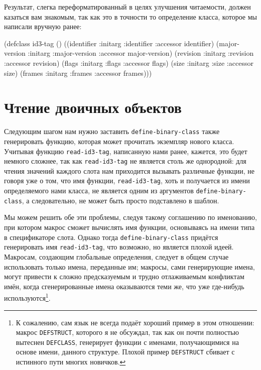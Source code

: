 Результат, слегка переформатированный в целях улучшения читаемости, должен казаться вам
знакомым, так как это в точности то определение класса, которое мы написали вручную ранее:

\begin{myverb}
(defclass id3-tag ()
  ((identifier      :initarg :identifier    :accessor identifier)
   (major-version   :initarg :major-version :accessor major-version)
   (revision        :initarg :revision      :accessor revision)
   (flags           :initarg :flags         :accessor flags)
   (size            :initarg :size          :accessor size)
   (frames          :initarg :frames        :accessor frames)))
\end{myverb}

\section{Чтение двоичных объектов}

Следующим шагом нам нужно заставить \lstinline{define-binary-class} также генерировать функцию,
которая может прочитать экземпляр нового класса. Учитывая функцию \lstinline{read-id3-tag},
написанную нами ранее, кажется, это будет немного сложнее, так как \lstinline{read-id3-tag} не
является столь же однородной: для чтения значений каждого слота нам приходится вызывать
различные функции, не говоря уже о том, что имя функции, \lstinline{read-id3-tag}, хоть и
получается из имени определяемого нами класса, не является одним из аргументов
\lstinline{define-binary-class}, а следовательно, не может быть просто подставлено в шаблон.

Мы можем решить обе эти проблемы, следуя такому соглашению по именованию, при котором
макрос сможет вычислять имя функции, основываясь на имени типа в спецификаторе
слота. Однако тогда \lstinline{define-binary-class} придётся генерировать имя
\lstinline{read-id3-tag}, что возможно, но является плохой идеей. Макросам, создающим
глобальные определения, следует в общем случае использовать только имена, переданные им;
макросы, сами генерирующие имена, могут привести к сложно предсказуемым и
трудно отлаживаемым конфликтам имён, когда сгенерированные имена оказываются теми же, что
уже где-нибудь используются\footnote{К сожалению, сам язык не всегда подаёт хороший пример
  в этом отношении: макрос \lstinline{DEFSTRUCT}, которого я не обсуждал, так как он почти
  полностью вытеснен \lstinline{DEFCLASS}, генерирует функции с именами, получающимися на
  основе имени, данного структуре. Плохой пример \lstinline{DEFSTRUCT} сбивает с истинного
  пути многих новичков.}.

